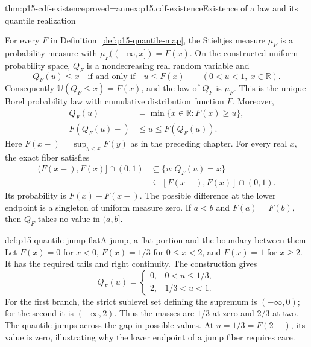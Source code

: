 \begin{hbtheorem}{thm:p15-cdf-existence}{proved=annex:p15.cdf-existence}{Existence of a law and its quantile realization}
\par\nobreak
For every \(F\) in Definition~\ref{def:p15-quantile-map}, the
Stieltjes measure \(\mu_F\) is a probability measure with
\(\mu_F((-\infty,x])=F(x)\). On the constructed uniform probability
space, \(Q_F\) is a nondecreasing real random variable and
\[
 Q_F(u)\leq x\quad\text{if and only if}\quad u\leq F(x)
                \qquad(0<u<1,\ x\in\mathbb R).
\]
Consequently \(\mathbb U(Q_F\leq x)=F(x)\), and the law of
\(Q_F\) is \(\mu_F\). This is the unique Borel probability law
with cumulative distribution function \(F\). Moreover,
\[
 \begin{aligned}
 Q_F(u)&=\min\{x\in\mathbb R:F(x)\geq u\},\\
 F(Q_F(u)-)&\leq u\leq F(Q_F(u)).
 \end{aligned}
\]
Here \(F(x-)=\sup_{y<x}F(y)\) as in the preceding chapter.
For every real \(x\), the exact fiber satisfies
\[
 \begin{aligned}
 (F(x-),F(x)]\cap(0,1)
       &\subseteq\{u:Q_F(u)=x\}\\
       &\subseteq[F(x-),F(x)]\cap(0,1).
 \end{aligned}
\]
Its probability is \(F(x)-F(x-)\). The possible difference at
the lower endpoint is a singleton of uniform measure zero. If
\(a<b\) and \(F(a)=F(b)\), then \(Q_F\) takes no value in
\((a,b]\).
\end{hbtheorem}

\begin{hbexample}{def:p15-quantile-jump-flat}{A jump, a flat portion and the boundary between them}
Let \(F(x)=0\) for \(x<0\), \(F(x)=1/3\) for \(0\leq x<2\),
and \(F(x)=1\) for \(x\geq2\). It has the required tails and right
continuity. The construction gives
\[
 Q_F(u)=
 \begin{cases}
 0,&0<u\leq1/3,\\
 2,&1/3<u<1.
 \end{cases}
\]
For the first branch, the strict sublevel set defining the supremum is
\((-\infty,0)\); for the second it is \((-\infty,2)\).
Thus the masses are \(1/3\) at zero and \(2/3\) at two. The quantile
jumps across the gap in possible values. At \(u=1/3=F(2-)\), its
value is zero, illustrating why the lower endpoint of a jump fiber
requires care.
\end{hbexample}

